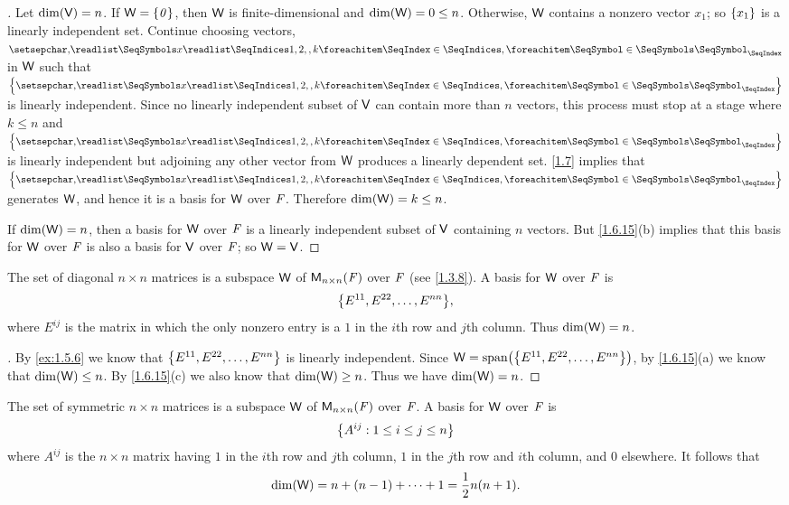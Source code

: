 \begin{proof}[]
  Let \(\dim(\mathsf{V}) = n\).
  If \(\mathsf{W} = \left\lbrace\mathit{0}\right\rbrace\), then \(\mathsf{W}\) is finite-dimensional and \(\dim(\mathsf{W}) = 0 \leq n\).
  Otherwise, \(\mathsf{W}\) contains a nonzero vector \(x_1\);
  so \(\left\lbrace x_1\right\rbrace\) is a linearly independent set.
  Continue choosing vectors, \(\seq{x}{1,2,,k}\) in \(\mathsf{W}\) such that \(\set{\seq{x}{1,2,,k}}\) is linearly independent.
  Since no linearly independent subset of \(\mathsf{V}\) can contain more than \(n\) vectors, this process must stop at a stage where \(k \leq n\) and \(\set{\seq{x}{1,2,,k}}\) is linearly independent but adjoining any other vector from \(\mathsf{W}\) produces a linearly dependent set.
  \cref{1.7} implies that \(\set{\seq{x}{1,2,,k}}\) generates \(\mathsf{W}\), and hence it is a basis for \(\mathsf{W}\) over \(\mathit{F}\).
  Therefore \(\dim(\mathsf{W}) = k \leq n\).

  If \(\dim(\mathsf{W}) = n\), then a basis for \(\mathsf{W}\) over \(\mathit{F}\) is a linearly independent subset of \(\mathsf{V}\) containing \(n\) vectors.
  But \cref{1.6.15}(b) implies that this basis for \(\mathsf{W}\) over \(\mathit{F}\) is also a basis for \(\mathsf{V}\) over \(\mathit{F}\);
  so \(\mathsf{W} = \mathsf{V}\).
\end{proof}

\begin{eg}\label{1.6.17}
  The set of diagonal \(n \times n\) matrices is a subspace \(\mathsf{W}\) of \(\mathsf{M}_{{n} \times n}({\mathit{F}})\) over \(\mathit{F}\)
  (see \cref{1.3.8}).
  A basis for \(\mathsf{W}\) over \(\mathit{F}\) is
  \[
    \set{E^{1 1}, E^{2 2}, \dots, E^{n n}},
  \]
  where \(E^{i j}\) is the matrix in which the only nonzero entry is a \(1\) in the \(i\)th row and \(j\)th column.
  Thus \(\dim(\mathsf{W}) = n\).
\end{eg}

\begin{proof}[]
  By \cref{ex:1.5.6} we know that \(\left\lbrace E^{1 1}, E^{2 2}, \dots, E^{n n}\right\rbrace\) is linearly independent.
  Since \(\W = \spn{\set{E^{1 1}, E^{2 2}, \dots, E^{n n}}}\), by \cref{1.6.15}(a) we know that \(\dim(\mathsf{W}) \leq n\).
  By \cref{1.6.15}(c) we also know that \(\dim(\mathsf{W}) \geq n\).
  Thus we have \(\dim(\mathsf{W}) = n\).
\end{proof}

\begin{eg}\label{1.6.18}
  The set of symmetric \(n \times n\) matrices is a subspace \(\mathsf{W}\) of \(\mathsf{M}_{{n} \times n}({\mathit{F}})\) over \(\mathit{F}\).
  A basis for \(\mathsf{W}\) over \(\mathit{F}\) is
  \[
    \left\lbrace A^{i j} : 1 \leq i \leq j \leq n\right\rbrace
  \]
  where \(A^{i j}\) is the \(n \times n\) matrix having \(1\) in the \(i\)th row and \(j\)th column, \(1\) in the \(j\)th row and \(i\)th column, and \(0\) elsewhere.
  It follows that
  \[
    \dim(\mathsf{W}) = n + (n - 1) + \cdots + 1 = \frac{1}{2} n(n + 1).
  \]
\end{eg}

